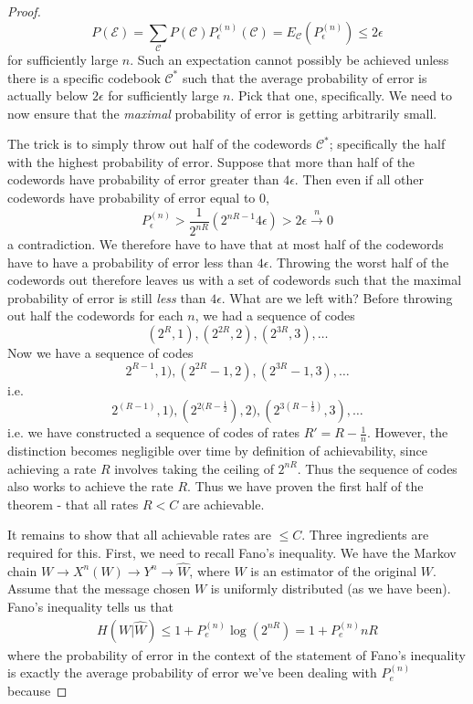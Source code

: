 \documentclass{article}
\theoremstyle{definition}
\theoremstyle{plain}
\begin{document}
\begin{proof}
\[P(\mathcal{E}) = \sum_{\mathcal{C}}P(\mathcal{C})P_{\epsilon}^{(n)}(\mathcal{C}) = E_{\mathcal{C}}( P_{\epsilon}^{(n)} ) \leq 2\epsilon \]
for sufficiently large $n$. Such an expectation cannot possibly be achieved unless there is a specific codebook $\mathcal{C}^*$ such that the average probability of error is actually below $2\epsilon$ for sufficiently large $n$. Pick that one, specifically. We need to now ensure that the \emph{maximal} probability of error is getting arbitrarily small. \par 
 The trick is to simply throw out half of the codewords $\mathcal{C}^*$; specifically the half with the highest probability of error. Suppose that more than half of the codewords have probability of error greater than $4\epsilon$. Then even if all other codewords have probability of error equal to $0$,
 \[ P_{\epsilon}^{(n)} > \frac{1}{2^{nR}}(2^{nR-1}4\epsilon) > 2\epsilon \overset{n}{\to} 0 \]
 a contradiction. We therefore have to have that at most half of the codewords have to have a probability of error less than $4\epsilon$. Throwing the worst half of the codewords out therefore leaves us with a set of codewords such that the maximal probability of error is still \emph{less} than $4\epsilon$. What are we left with? Before throwing out half the codewords for each $n$, we had a sequence of codes 
 \[ (2^R,1),(2^{2R},2),(2^{3R},3),\ldots \]
 Now we have a sequence of codes
 \[ 2^{R-1},1),(2^{2R}-1,2),(2^{3R}-1,3),\ldots \]
 i.e.
 \[ 2^{(R-1)},1),(2^{2(R-\frac{1}{2}}),2),(2^{3(R-\frac{1}{3})},3),\ldots \]
 i.e. we have constructed a sequence of codes of rates $R' = R-\frac{1}{n}$. However, the distinction becomes negligible over time by definition of achievability, since achieving a rate $R$ involves taking the ceiling of $2^{nR}$. Thus the sequence of codes also works to achieve the rate $R$. Thus we have proven the first half of the theorem - that all rates $R < C$ are achievable. \par 
 It remains to show that all achievable rates are $\leq C$. Three ingredients are required for this. First, we need to recall Fano's inequality. We have the Markov chain $W \to X^n(W) \to Y^n \to \hat{W}$, where $\hat{W}$ is an estimator of the original $W$. Assume that the message chosen $W$ is uniformly distributed (as we have been). Fano's inequality tells us that
 \begin{align}
	H(W|\hat{W}) \leq 1+P_e^{(n)}\log(2^{nR}) = 1+P_e^{(n)}nR
 \end{align}
 where the probability of error in the context of the statement of Fano's inequality is exactly the average probability of error we've been dealing with $P_e^{(n)}$ because

\end{proof}
\end{document}
